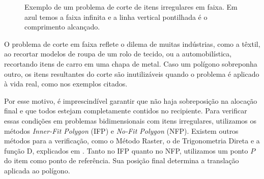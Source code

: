 \documentclass{article}
\newcommand{\corA}{Gray}
\newcommand{\corB}{DarkOrchid}
\newcommand{\corC}{LimeGreen}
\newcommand{\corD}{Mahogany}
\newcommand{\corE}{OrangeRed}
\newcommand{\corT}{Periwinkle}
\newcommand{\corU}{RedViolet}
\newcommand{\corV}{SkyBlue}
\newcommand{\corW}{Thistle}
\begin{document}
\begin{figure}[H]
    \caption{Exemplo de um problema de corte de itens irregulares em faixa. Em azul temos a faixa infinita e a linha vertical pontilhada é o comprimento alcançado.}
    \label{fig:f1}
\end{figure}


O problema de corte em faixa reflete o dilema de muitas indústrias, como a têxtil, ao recortar modelos de roupa de um rolo de tecido, ou a automobilística, recortando itens de carro em uma chapa de metal. Caso um polígono sobreponha outro, os itens resultantes do corte são inutilizáveis quando o problema é aplicado à vida real, como nos exemplos citados.

Por esse motivo, é imprescindível garantir que não haja sobreposição na alocação final e que todos estejam completamente contidos no recipiente. Para verificar essas condições em problemas bidimensionais com itens irregulares, utilizamos os métodos {\it Inner-Fit Polygon} (IFP) e {\it No-Fit Polygon} (NFP). Existem outros métodos para a verificação, como o Método Raster, o de Trigonometria Direta e a função D, explicados em \cite{geometry}. Tanto no IFP quanto no NFP, utilizamos um ponto $P$ do item como ponto de referência. Sua posição final determina a translação aplicada ao polígono.
\end{document}
